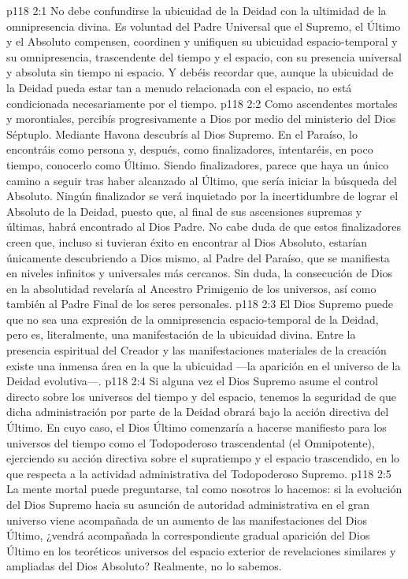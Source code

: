\vs p118 2:1 No debe confundirse la ubicuidad de la Deidad con la ultimidad de la omnipresencia divina. Es voluntad del Padre Universal que el Supremo, el Último y el Absoluto compensen, coordinen y unifiquen su ubicuidad espacio\hyp{}temporal y su omnipresencia, trascendente del tiempo y el espacio, con su presencia universal y absoluta sin tiempo ni espacio. Y debéis recordar que, aunque la ubicuidad de la Deidad pueda estar tan a menudo relacionada con el espacio, no está condicionada necesariamente por el tiempo.
\vs p118 2:2 \pc Como ascendentes mortales y morontiales, percibís progresivamente a Dios por medio del ministerio del Dios Séptuplo. Mediante Havona descubrís al Dios Supremo. En el Paraíso, lo encontráis como persona y, después, como finalizadores, intentaréis, en poco tiempo, conocerlo como Último. Siendo finalizadores, parece que haya un único camino a seguir tras haber alcanzado al Último, que sería iniciar la búsqueda del Absoluto. Ningún finalizador se verá inquietado por la incertidumbre de lograr el Absoluto de la Deidad, puesto que, al final de sus ascensiones supremas y últimas, habrá encontrado al Dios Padre. No cabe duda de que estos finalizadores creen que, incluso si tuvieran éxito en encontrar al Dios Absoluto, estarían únicamente descubriendo a Dios mismo, al Padre del Paraíso, que se manifiesta en niveles infinitos y universales más cercanos. Sin duda, la consecución de Dios en la absolutidad revelaría al Ancestro Primigenio de los universos, así como también al Padre Final de los seres personales.
\vs p118 2:3 El Dios Supremo puede que no sea una expresión de la omnipresencia espacio\hyp{}temporal de la Deidad, pero es, literalmente, una manifestación de la ubicuidad divina. Entre la presencia espiritual del Creador y las manifestaciones materiales de la creación existe una inmensa área en la que la ubicuidad  ---la aparición en el universo de la Deidad evolutiva---.
\vs p118 2:4 Si alguna vez el Dios Supremo asume el control directo sobre los universos del tiempo y del espacio, tenemos la seguridad de que dicha administración por parte de la Deidad obrará bajo la acción directiva del Último. En cuyo caso, el Dios Último comenzaría a hacerse manifiesto para los universos del tiempo como el Todopoderoso trascendental (el Omnipotente), ejerciendo su acción directiva sobre el supratiempo y el espacio trascendido, en lo que respecta a la actividad administrativa del Todopoderoso Supremo.
\vs p118 2:5 La mente mortal puede preguntarse, tal como nosotros lo hacemos: si la evolución del Dios Supremo hacia su asunción de autoridad administrativa en el gran universo viene acompañada de un aumento de las manifestaciones del Dios Último, ¿vendrá acompañada la correspondiente gradual aparición del Dios Último en los teoréticos universos del espacio exterior de revelaciones similares y ampliadas del Dios Absoluto? Realmente, no lo sabemos.
